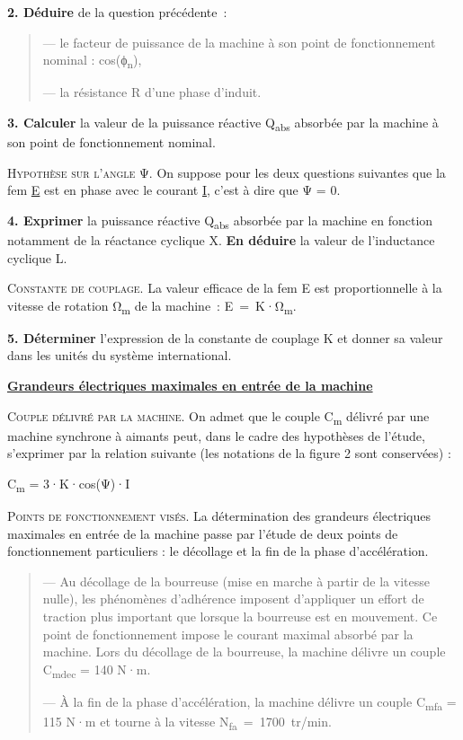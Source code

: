 \textbf{2. Déduire} de la question précédente~:

\begin{quote}
--- le facteur de puissance de la machine à son point de fonctionnement nominal : cos(ϕ\textsubscript{n}),

--- la résistance R d'une phase d'induit.
\end{quote}

\textbf{3. Calculer} la valeur de la puissance réactive Q\textsubscript{abs} absorbée par la machine à son point de fonctionnement nominal.

\textsc{Hypothèse sur l'angle} Ψ. On suppose pour les deux questions suivantes que la fem \ul{E} est en phase avec le courant \ul{I}, c'est à dire que Ψ = 0.

\textbf{4. Exprimer} la puissance réactive Q\textsubscript{abs} absorbée par la machine en fonction notamment de la réactance cyclique X. \textbf{En déduire} la valeur de l'inductance cyclique L.

\textsc{Constante de couplage}. La valeur efficace de la fem E est proportionnelle à la vitesse de rotation Ω\textsubscript{m} de la machine~: E~=~K·Ω\textsubscript{m}.

\textbf{5. Déterminer} l'expression de la constante de couplage K et donner sa valeur dans les unités du système international.

\textbf{\ul{Grandeurs électriques maximales en entrée de la machine}}

\textsc{Couple délivré par la machine}. On admet que le couple C\textsubscript{m} délivré par une machine synchrone à aimants peut, dans le cadre des hypothèses de l'étude, s'exprimer par la relation suivante (les notations de la figure 2 sont conservées) :

C\textsubscript{m} = 3·K·cos(Ψ)·I

\textsc{Points de fonctionnement visés}. La détermination des grandeurs électriques maximales en entrée de la machine passe par l'étude de deux points de fonctionnement particuliers : le décollage et la fin de la phase d'accélération.

\begin{quote}
--- Au décollage de la bourreuse (mise en marche à partir de la vitesse nulle), les phénomènes d'adhérence imposent d'appliquer un effort de traction plus important que lorsque la bourreuse est en mouvement. Ce point de fonctionnement impose le courant maximal absorbé par la machine. Lors du décollage de la bourreuse, la machine délivre un couple C\textsubscript{mdec} = 140 N·m.

--- À la fin de la phase d'accélération, la machine délivre un couple C\textsubscript{mfa} = 115 N·m et tourne à la vitesse N\textsubscript{fa}~=~1700~tr/min.
\end{quote}

